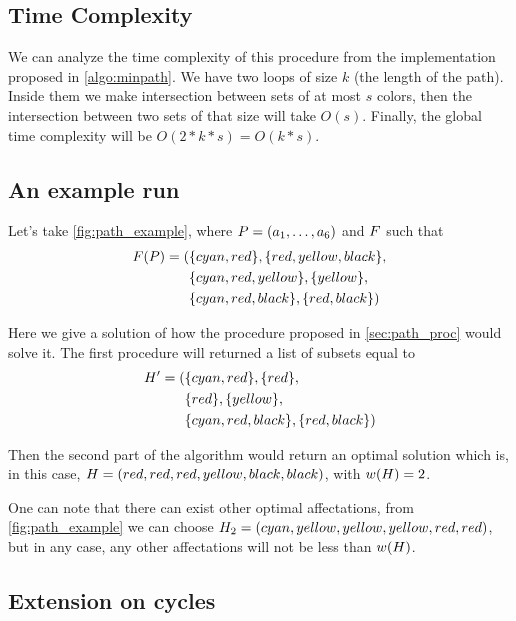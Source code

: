 \subsection{Time Complexity}

We can analyze the time complexity of this procedure from the implementation proposed in \cref{algo:minpath}. We have two loops of size $k$ (the length of the path). Inside them we make intersection between sets of at most $s$ colors, then the intersection between two sets of that size will take $O(s)$. Finally, the global time complexity will be $O(2 * k * s) = O(k*s)$.

\subsection{An example run}
\label{sec:path_ex_run}



Let's take \cref{fig:path_example}, where $P = (a_1,\ldots,a_{6})$ and $F$ such that
\begin{align*}
  F(P) = ( & \{cyan,red\}, \{red,yellow,black\},    \\
                   & \{cyan,red,yellow\}, \{yellow\},    \\
                   & \{cyan,red,black\}, \{red,black\}   )
\end{align*}

Here we give a solution of how the procedure proposed in \cref{sec:path_proc} would solve it. The first procedure will returned a list of subsets equal to
\begin{align*}
  H' = ( & \{cyan,red\}, \{red\},      \\
               & \{red\}, \{yellow\},        \\
               & \{cyan,red,black\}, \{red,black\}   )
\end{align*}

Then the second part of the algorithm would return an optimal solution which is, in this case, $H = (red, red, red, yellow, black, black)$, with $w(H) = 2$.

One can note that there can exist other optimal affectations, from \cref{fig:path_example} we can choose $H_2 = (cyan, yellow, yellow, yellow, red, red)$, but in any case, any other affectations will not be less than  $w(H)$.

\subsection{Extension on cycles}


